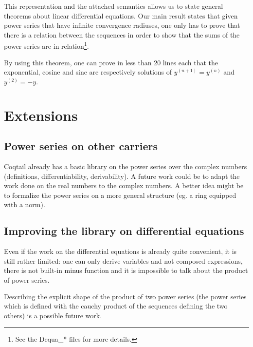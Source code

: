 \documentclass[submission,copyright]{eptcs}
\begin{document}
This representation and the attached semantics allows us to state general
theorems about linear differential equations. Our main result states that
given power series that have infinite convergence radiuses, one only has
to prove that there is a relation between the sequences in order to show
that the sums of the power series are in relation\footnote{See the
Dequa\_* files for more details.}.


By using this theorem, one can prove in less than 20 lines each that the
exponential, cosine and sine are respectively solutions of
$y^{(n+1)} = y^{(n)}$ and $y^{(2)} = - y$.

\section{Extensions}

\subsection{Power series on other carriers}

Coqtail already has a basic library on the power series over the complex
numbers (definitions, differentiability, derivability). A future work
could be to adapt the work done on the real numbers to the complex numbers.
A better idea might be to formalize the power series on a more general
structure (eg. a ring equipped with a norm).

\subsection{Improving the library on differential equations}

Even if the work on the differential equations is already quite
convenient, it is still rather limited: one can only derive variables
and not composed expressions, there is not built-in minus function and it
is impossible to talk about the product of power series.

Describing the explicit shape of the product of two power series (the
power series which is defined with the cauchy product of the sequences
defining the two others) is a possible future work.
\end{document}
